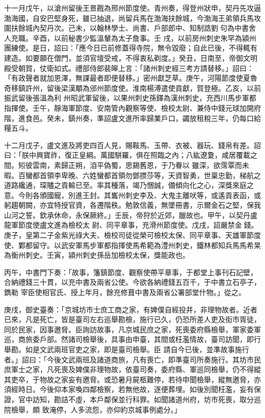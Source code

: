 \begin{pinyinscope}
 十一月戊午，以滄州留後王景戡為邢州節度使。青州奏，得登州狀申，契丹先攻逼渤海國，自安巴堅身死，雖已抽退，尚留兵馬在渤海扶餘城，今渤海王弟領兵馬攻圍扶餘城內契丹次。己未，以翰林學士、尚書、戶部郎中、知制誥劉句為中書舍人充職。辛酉，以前秘書少監溫輦為太子詹事。壬
 戌，以前房州刺史朱罕為潁州團練使。是日，詔曰：「應今日已前修蓋得寺院，無令毀廢；自此已後，不得輒有建造。如要願在僧門，並須官壇受戒，不得衷私剃度。」癸丑，日南至，帝御文明殿受朝賀，仗衛如式。禮部侍郎裴皞上言：「諸州刺史經三考方請替移。」詔曰：「有政聲者就加恩澤，無課最者即便替移。」密州獻芝草。庚午，河陽節度使夏魯奇移鎮許州，留後梁漢顒為邠州節度使。淮南楊溥遣使貢獻，賀登極。乙亥，以前振武留後張溫為利
 州昭武軍留後，以果州刺史孫鐸為漢州刺史，充西川馬步軍都指揮使。壬午，靜海軍節度、安南管內觀察等使、檢校太尉、兼侍中錢元球加開府階，進食邑。癸未，鎮州奏，準詔盧文進所率歸業戶口，蠲放租稅三年，仍每口給糧五斗。



 十二月戊子，盧文進及將吏四百人見，賜鞍馬、玉帶、衣被、器玩、錢帛有差。詔曰：「朕中興寶祚，復正皇綱。萬國駢羅，俱在照臨之內；八紘遼夐，咸居覆載之間。矧彼雲南，素歸正朔，洎平偽蜀，思錫舊恩，于乃眷以
 雖深，欲霈覃而未暇。百蠻都首領李卑晚、六姓蠻都首領勿鄧摽莎等，天資智勇，世稟忠勤，梯航之道路纔通，琛贐之貢輸已至。率其種落，竭乃悃誠，備傾向化之心，深獎來庭之意。今則各頒國寵，別進王封。其巂州刺史李及、大鬼主離吠等，或遙貢表函，或躬趨朝闕，亦宜特授官資，各遷階秩。勉敦信義，無墜冊書，示爾金石之堅，保我山河之誓。欽承休命，永保厥終。」壬辰，帝狩於近郊，臘故也。甲午，以契丹盧龍軍節度使盧文進為檢校太
 尉、同平章事，充滑州節度使。戊戌，詔嚴禁金錢。庚子，皇第二子金紫光祿大夫、檢校司徒從榮可檢校太保、同平章事、天雄軍節度使、鄴都留守。以武安軍馬步軍都指揮使馬希範為澧州刺史，鐵林都知兵馬馬希杲為衡州刺史。壬寅，潁州刺史孫岳加檢校太保，獎能政也。



 丙午，中書門下奏：「故事，籓鎮節度、觀察使帶平章事，于都堂上事刊石記壁，合納禮錢三十貫，以充中書及兩省公使。今欲各納禮錢五百千，于中書立石亭子，鐫勒
 宰臣使相官氏、授上年月，餘充修葺中書及兩省公署部堂什物。」從之。



 庚戌，御史臺奏：「京城坊市士庶工商之家，有婢僕自經投井，非理物故者。近者已來，凡是死亡，皆是臺司左右巡舉勘檢，施行已久，仍恐所差人吏及街市胥徒，同於民家，因事邀脅。臣詢訪故事，凡京城民庶之家，死喪委府縣檢舉，軍家委軍巡，商旅委戶部。然諸司檢舉後，具事由申臺，其間或枉濫情故，臺司訪聞，即行舉勘。如是文武兩班官吏之家，即是臺司檢舉。臣
 請自今已後，並準故事施行者。」詔曰：「今後文武兩班及諸道商旅，凡有喪亡，即準臺司所奏施行。其坊市民庶軍士之家，凡死喪及婢僕非理物故，依臺司奏，委府縣、軍巡同檢舉，仍不得縱其吏卒，于物故之家妄有邀脅。或恐暑月屍柩難停，若待申聞檢舉，縱無邀脅，亦須經時日。今後仰本家喚四鄰檢察，若無他故，逐便葬埋。如後別聞枉濫，妄有保證，官中訪知，勘詰不虛，本戶鄰保並行科罪。如聞諸道州府，坊市死喪，取分巡院檢舉，頗
 致淹停，人多流怨，亦仰約京城事例處分。」



\end{pinyinscope}